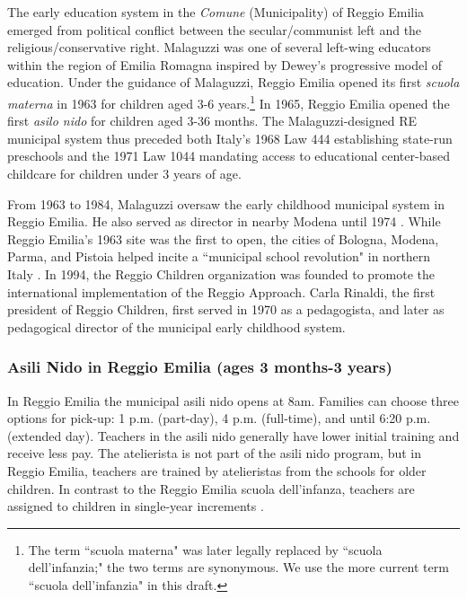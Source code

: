 \documentclass[11pt]{article}
\begin{document}
The early education system in the \textit{Comune} (Municipality) of Reggio Emilia emerged from political conflict between the secular/communist left and the religious/conservative right. Malaguzzi was one of several left-wing educators within the region of Emilia Romagna inspired by Dewey's progressive model of education. Under the guidance of Malaguzzi, Reggio Emilia opened its first \textit{scuola materna} in 1963 for children aged 3-6 years.\footnote{The term ``scuola materna" was later legally replaced by ``scuola dell'infanzia;" the two terms are synonymous. We use the more current term ``scuola dell'infanzia" in this draft.} In 1965, Reggio Emilia opened the first \textit{asilo nido} for children aged 3-36 months. The Malaguzzi-designed RE municipal system thus preceded both Italy's 1968 Law 444 establishing state-run preschools and the 1971 Law 1044 mandating access to educational center-based childcare for children under 3 years of age. 

From 1963 to 1984, Malaguzzi oversaw the early childhood municipal system in Reggio Emilia. He also served as director in nearby Modena until 1974 \citep{Cagliari-etal-eds_2016_BOOK_Loris-Malaguzzi}. While Reggio Emilia's 1963 site was the first to open, the cities of Bologna, Modena, Parma, and Pistoia helped incite a ``municipal school revolution" in northern Italy \citep{Hohnerlein_2015_Development-and-Diffusion}. In 1994, the Reggio Children organization was founded to promote the international implementation of the Reggio Approach. Carla Rinaldi, the first president of Reggio Children, first served in 1970 as a pedagogista, and later as pedagogical director of the municipal early childhood system. 

\subsubsection{Asili Nido in Reggio Emilia (ages 3 months-3 years)} 

In Reggio Emilia the municipal asili nido opens at 8am. Families can choose three options for pick-up: 1 p.m. (part-day), 4 p.m. (full-time), and until 6:20 p.m. (extended day). Teachers in the asili nido generally have lower initial training and receive less pay. The atelierista is not part of the asili nido program, but in Reggio Emilia, teachers are trained by atelieristas from the schools for older children. In contrast to the Reggio Emilia scuola dell'infanza, teachers are assigned to children in single-year increments \citep{Cagliari-etal-eds_2016_BOOK_Loris-Malaguzzi,Giudici-Nicolosi_2014_Reggio-Approach}.
\end{document}
